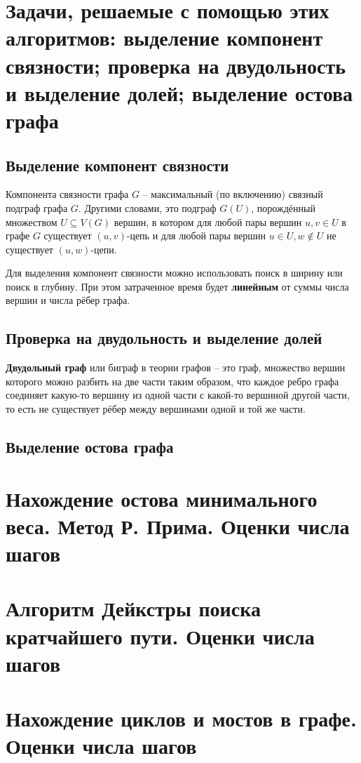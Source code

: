 \documentclass[40pt]{article}
\begin{document}
\section{Задачи, решаемые с помощью этих алгоритмов: выделение компонент связности; проверка на двудольность и выделение долей; выделение остова графа}

\subsection{Выделение компонент связности}

Компонента связности графа $G$ -- максимальный (по включению) связный подграф графа $G$. Другими словами, это подграф $G(U)$, порождённый множеством $U \subseteq V(G)$ вершин, в котором для любой пары вершин $u, v \in U$ в графе $G$ существует $(u, v)$-цепь и для любой пары вершин $u \in U, w \notin U$ не существует $(u, w)$-цепи.

Для выделения компонент связности можно использовать поиск в ширину или поиск в глубину. При этом затраченное время будет \textbf{линейным} от суммы числа вершин и числа рёбер графа.

\subsection{Проверка на двудольность и выделение долей}

\textbf{Двудольный граф} или биграф в теории графов -- это граф, множество вершин которого можно разбить на две части таким образом, что каждое ребро графа соединяет какую-то вершину из одной части с какой-то вершиной другой части, то есть не существует рёбер между вершинами одной и той же части.

\subsection{Выделение остова графа}


\section{Нахождение остова минимального веса. Метод Р. Прима. Оценки числа шагов}
\section{Алгоритм Дейкстры поиска кратчайшего пути. Оценки числа шагов}
\section{Нахождение циклов и мостов в графе.  Оценки числа шагов}
\end{document}
